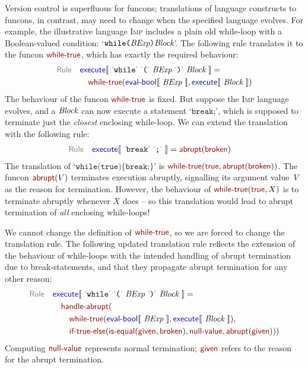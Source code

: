 \documentclass[runningheads,fleqn]{llncs}
\begin{document}
Version control is superfluous for funcons;
translations of language constructs to funcons, in contrast, may need to change
when the specified language evolves.
For example, the illustrative language \textsc{Imp} includes a plain old while-loop
with a Boolean-valued condition:
`$\texttt{while} \texttt{(} \textit{BExp} \texttt{)} \textit{Block}$'.
The following rule translates it to the funcon $\NAME{while-true}$,
which has exactly the required behaviour:
%
\begin{align*}
  \KEY{Rule} \quad
    & \SEM{execute} \LEFTPHRASE \
        \LEX{while} \ \LEX{(} \ \VAR{BExp} \ \LEX{)} \ \VAR{Block} \ \RIGHTPHRASE  = \\&\quad
      \NAME{while-true}
        (  \SEM{eval-bool} \LEFTPHRASE \ \VAR{BExp} \ \RIGHTPHRASE , 
               \SEM{execute} \LEFTPHRASE \ \VAR{Block} \ \RIGHTPHRASE  )
\end{align*}
%
The behaviour of the funcon $\NAME{while-true}$ is fixed.
But suppose the \textsc{Imp} language evolves,
and a $\textit{Block}$ can now execute a statement `$\texttt{break;}$',
which is supposed to terminate just the \textit{closest} enclosing while-loop.
We can extend the translation with the following rule:
%
\begin{align*}
  \KEY{Rule} \quad
    & \SEM{execute} \LEFTPHRASE \ \LEX{break} \ \LEX{;} \ \RIGHTPHRASE  = 
      \NAME{abrupt}(\NAME{broken})
\end{align*}
%
The translation of `$\texttt{while(true)\{break;\}}$' is 
$\NAME{while-true}(\NAME{true}, \NAME{abrupt}(\NAME{broken}))$.
The funcon $\NAME{abrupt}(V)$ terminates execution abruptly,
signalling its argument value~$V$ as the reason for termination.
However, the behaviour of $\NAME{while-true}(\NAME{true}, X)$ is to terminate abruptly whenever $X$ does
-- so this translation would lead to abrupt termination of \emph{all} enclosing while-loops!

We cannot change the definition of $\NAME{while-true}$,
so we are forced to change the translation rule.
The following updated translation rule reflects the extension of the behaviour of while-loops
with the intended handling of abrupt termination due to break-statements,
and that they propagate abrupt termination for any other reason:
%
\begin{align*}
  \KEY{Rule} \quad
    & \SEM{execute} \LEFTPHRASE \
        \LEX{while} \ \LEX{(} \ \VAR{BExp} \ \LEX{)} \ \VAR{Block} \ \RIGHTPHRASE  = \\&\quad
      \NAME{handle-abrupt}
        (  \\&\quad\quad
        \NAME{while-true}
            (  \SEM{eval-bool} \LEFTPHRASE \ \VAR{BExp} \ \RIGHTPHRASE , 
               \SEM{execute} \LEFTPHRASE \ \VAR{Block} \ \RIGHTPHRASE  ),\\&\quad\quad
            \NAME{if-true-else}
            (   \NAME{is-equal} ( \NAME{given}, \NAME{broken}), 
               \NAME{null-value},
               \NAME{abrupt}(\NAME{given})))
\end{align*}
%
Computing $\NAME{null-value}$ represents normal termination;
$\NAME{given}$ refers to the reason for the abrupt termination.
\end{document}

